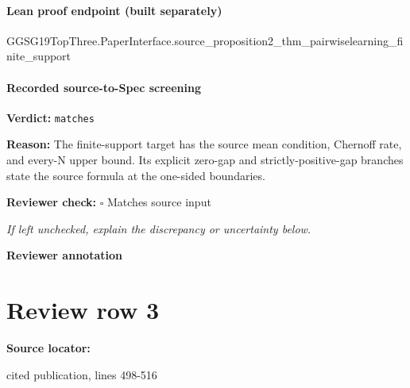 \documentclass[10pt]{article}
\newcommand{\reviewerbox}{%
  \par\noindent\fbox{\parbox{0.96\linewidth}{\rule{0pt}{0.38in}}}\par
}
\newcommand{\reviewmatch}[1]{%
  \par\noindent\textbf{Reviewer check:} $\square$\; #1\par
  \noindent\emph{If left unchecked, explain the discrepancy or uncertainty below.}\par
}
\begin{document}
\paragraph{Lean proof endpoint (built separately)}\begin{ReviewVerbatim}
GGSG19TopThree.PaperInterface.source_proposition2_thm_pairwiselearning_finite_support
\end{ReviewVerbatim}

\paragraph{Recorded source-to-Spec screening}
\textbf{Verdict:} \texttt{matches}
\\
{\raggedright
\textbf{Reason:} The finite-\allowbreak{}support target has the source mean condition, Chernoff rate, and every-\allowbreak{}N upper bound.\allowbreak{} Its explicit zero-\allowbreak{}gap and strictly-\allowbreak{}positive-\allowbreak{}gap branches state the source formula at the one-\allowbreak{}sided boundaries.\allowbreak{}
\par}
\reviewmatch{Matches source input}
\noindent\textbf{Reviewer annotation}\par
\reviewerbox
\clearpage
\hypertarget{source-claim-baeee6d035a90ee1}{}
\section*{Review row 3}
\textbf{Source locator:} {\footnotesize\raggedright cited publication, lines 498-\allowbreak{}516\par}
\end{document}
